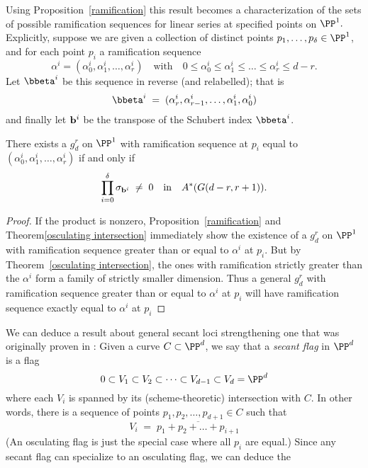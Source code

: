 Using Proposition~\ref{ramification} this result becomes a characterization of the sets of possible ramification
sequences for linear series at specified points on $\PP^1.$
 Explicitly, suppose we are given a collection of distinct points $p_1,\dots,p_\delta \in \PP^1$, and for each point $p_i$ a ramification sequence
$$
\alpha^i = (\alpha^i_0, \alpha^i_1, \dots, \alpha^i_r) \quad \text{with} \quad 0 \leq \alpha^i_0 \leq \alpha^i_1 \leq \dots \leq \alpha^i_r \leq d-r.
$$
Let ${\bbeta}^i$ be this sequence in reverse (and relabelled); that is
$$
{\bbeta}^i \; = \; (\alpha^i_r, \alpha^i_{r-1}, \dots, \alpha^i_1, \alpha^i_0)
$$
and finally let ${\bf b}^i$ be the transpose of the Schubert index ${\bbeta}^i$. 

\begin{corollary}
There exists a $g^r_d$ on $\PP^1$ with ramification sequence at $p_i$ equal to $(\alpha^i_0, \alpha^i_1, \dots, \alpha^i_r)$ if and only if 
$$
\prod_{i=0}^\delta  \sigma_{{\bf b}^i} \; \neq \; 0 \quad \text{in} \quad A^*(G(d-r, r+1)).
$$
\end{corollary}

\begin{proof}
If the product is nonzero, Proposition~\ref{ramification} and Theorem\ref{osculating intersection} immediately show the existence of a $g^r_d$ on $\PP^1$ with ramification sequence greater than or equal to $\alpha^i$ at $p_i$. But by Theorem~\ref{osculating intersection}, the ones with ramification strictly greater than the $\alpha^i$ form a family of strictly smaller dimension. Thus a general $g^r_d$ with ramification sequence greater than or equal to $\alpha^i$ at $p_i$ will have  ramification sequence exactly equal to $\alpha^i$ at $p_i$
\end{proof}

We can deduce a result about general secant loci strengthening one that was originally proven in \cite{Griffiths-Harris-BN}:
Given a curve $C \subset \PP^d$, we say that a \emph{secant flag} in $\PP^d$ is a flag
$$
0 \subset V_1 \subset V_2 \subset \dots \subset V_{d-1} \subset V_d = \PP^d
$$
where each $V_i$ is spanned by its (scheme-theoretic) intersection with $C$. In other words, there is a sequence of points $p_1, p_2, \dots, p_{d+1} \in C$ such that
$$
V_i \; = \; \overline{p_1+p_2+ \dots + p_{i+1}}
$$
(An osculating flag is just the special case where all $p_i$ are equal.) Since any secant flag can specialize to an osculating flag, we can deduce the

